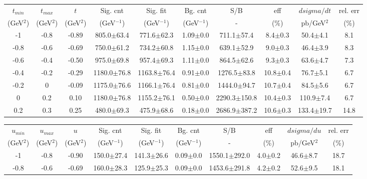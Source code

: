 \begin{landscape}
\begin{table}[hbpt]
  \begin{center}
    \begin{tabular}{|c|c|c|c|c|c|c|c|c|c|}
      \hline
      $t_{min}$ & $t_{max}$ & $t$ & Sig. cnt & Sig. fit & Bg. cnt & S/B & eff & $dsigma/dt$ & rel. err \\ 
      (GeV$^{2}$) & (GeV$^{2}$) & (GeV$^{2}$) & (GeV$^{-1}$) & (GeV$^{-1}$) & (GeV$^{-1}$) & - & (\%) & pb/GeV$^{2}$ & (\%) \\	
      \hline
 -1 & -0.8 & -0.89 & 805.0$\pm$63.4 &  771.6$\pm$62.3 &  1.09$\pm$0.0 &  711.1$\pm$57.4 & 8.4$\pm$0.3 &  50.4$\pm$4.1 & 8.1 \\ 
 \hline 
 -0.8 & -0.6 & -0.69 & 750.0$\pm$61.2 &  734.2$\pm$60.8 &  1.15$\pm$0.0 &  639.1$\pm$52.9 & 9.0$\pm$0.3 &  46.4$\pm$3.9 & 8.3 \\ 
 \hline 
 -0.6 & -0.4 & -0.50 & 975.0$\pm$69.8 &  957.4$\pm$69.3 &  1.11$\pm$0.0 &  864.5$\pm$62.6 & 9.3$\pm$0.3 &  63.6$\pm$4.7 & 7.3 \\ 
 \hline 
 -0.4 & -0.2 & -0.29 & 1180.0$\pm$76.8 &  1163.8$\pm$76.4 &  0.91$\pm$0.0 &  1276.5$\pm$83.8 & 10.8$\pm$0.4 &  76.7$\pm$5.1 & 6.7 \\ 
 \hline 
 -0.2 & 0 & -0.09 & 1175.0$\pm$76.6 &  1166.1$\pm$76.4 &  0.81$\pm$0.0 &  1444.0$\pm$94.7 & 10.7$\pm$0.4 &  84.5$\pm$5.6 & 6.7 \\ 
 \hline 
 0 & 0.2 & 0.10 & 1180.0$\pm$76.8 &  1155.2$\pm$76.1 &  0.50$\pm$0.0 &  2290.3$\pm$150.8 & 10.4$\pm$0.3 &  110.9$\pm$7.4 & 6.7 \\ 
 \hline 
 0.2 & 0.3 & 0.25 & 480.0$\pm$69.3 &  475.9$\pm$68.6 &  0.18$\pm$0.0 &  2686.9$\pm$387.2 & 10.6$\pm$0.3 &  133.4$\pm$19.7 & 14.8 \\ 
 \hline 
    \end{tabular}
    \begin{tabular}{|c|c|c|c|c|c|c|c|c|c|}
      \hline
      $u_{min}$ & $u_{max}$ & $u$ & Sig. cnt & Sig. fit & Bg. cnt & S/B & eff & $dsigma/du$ & rel. err \\ 
      (GeV$^{2}$) & (GeV$^{2}$) & (GeV$^{2}$) & (GeV$^{-1}$) & (GeV$^{-1}$) & (GeV$^{-1}$) & - & (\%) & pb/GeV$^{2}$ & (\%) \\	
      \hline
 -1 & -0.8 & -0.90 & 150.0$\pm$27.4 &  141.3$\pm$26.6 &  0.09$\pm$0.0 &  1550.1$\pm$292.0 & 4.0$\pm$0.2 &  46.6$\pm$8.7 & 18.7 \\ 
 \hline 
 -0.8 & -0.6 & -0.69 & 160.0$\pm$28.3 &  125.9$\pm$25.3 &  0.09$\pm$0.0 &  1453.6$\pm$291.8 & 4.2$\pm$0.2 &  52.6$\pm$9.5 & 18.1 \\ 

\end{tabular}
\end{center}
\end{table}
\end{landscape}
